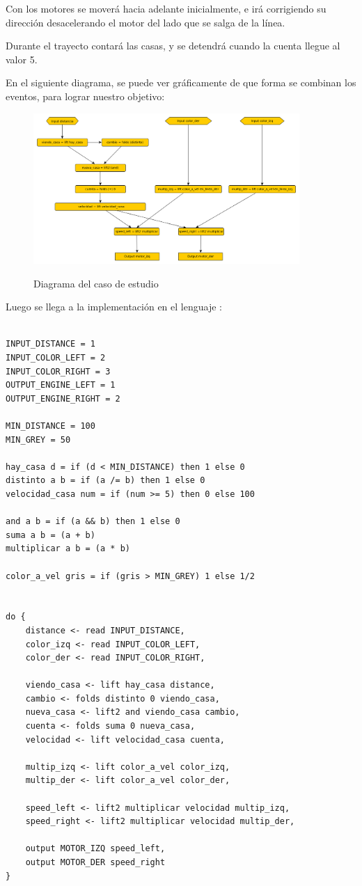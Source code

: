   Con los motores se moverá hacia adelante inicialmente, e irá corrigiendo
  su dirección desacelerando el motor del lado que se salga de la línea.

  Durante el trayecto contará las casas, y se detendrá cuando la cuenta
llegue al valor 5.

  En el siguiente diagrama, se puede ver gráficamente de que forma
se combinan los eventos, para lograr nuestro objetivo:

\begin{figure}[hbtp]
\begin{center}
\caption{Diagrama del caso de estudio}
\includegraphics[width=0.9\textwidth]{graphs/delivery.png}
\label{fig:delivery}
\end{center}
\end{figure}

  Luego se llega a la implementación en el lenguaje \frob :

\begin{verbatim}

INPUT_DISTANCE = 1
INPUT_COLOR_LEFT = 2
INPUT_COLOR_RIGHT = 3
OUTPUT_ENGINE_LEFT = 1
OUTPUT_ENGINE_RIGHT = 2

MIN_DISTANCE = 100
MIN_GREY = 50

hay_casa d = if (d < MIN_DISTANCE) then 1 else 0
distinto a b = if (a /= b) then 1 else 0
velocidad_casa num = if (num >= 5) then 0 else 100

and a b = if (a && b) then 1 else 0
suma a b = (a + b)
multiplicar a b = (a * b)

color_a_vel gris = if (gris > MIN_GREY) 1 else 1/2


do {
    distance <- read INPUT_DISTANCE,
    color_izq <- read INPUT_COLOR_LEFT,
    color_der <- read INPUT_COLOR_RIGHT,

    viendo_casa <- lift hay_casa distance,
    cambio <- folds distinto 0 viendo_casa,
    nueva_casa <- lift2 and viendo_casa cambio,
    cuenta <- folds suma 0 nueva_casa,
    velocidad <- lift velocidad_casa cuenta,

    multip_izq <- lift color_a_vel color_izq,
    multip_der <- lift color_a_vel color_der,

    speed_left <- lift2 multiplicar velocidad multip_izq,
    speed_right <- lift2 multiplicar velocidad multip_der,

    output MOTOR_IZQ speed_left,
    output MOTOR_DER speed_right
}

\end{verbatim}

